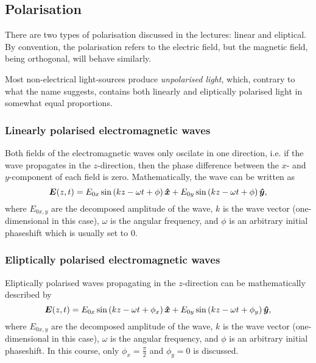     \subsection{Polarisation}
        There are two types of polarisation discussed in the lectures: linear and eliptical.
        By convention, the polarisation refers to the electric field, 
        but the magnetic field, being orthogonal, will behave similarly.
        
        Most non-electrical light-sources produce \textit{unpolarised light}, which, contrary to what the name suggests, 
        contains both linearly and eliptically polarised light in somewhat equal proportions. 

        \subsubsection{Linearly polarised electromagnetic waves}
            Both fields of the electromagnetic waves only oscilate in one direction,
            i.e. if the wave propagates in the $z$-direction, 
            then the phase difference between the $x$- and $y$-component of each field is zero.
            Mathematically, the wave can be written as
            \begin{equation}
                \E(z, t) = E_{0x}\sin\left(kz - \omega t + \phi\right)\hat{x} +
                E_{0y}\sin\left(kz - \omega t + \phi\right)\hat{y},
            \end{equation}
            where $E_{0x,y}$ are the decomposed amplitude of the wave, 
            $k$ is the wave vector (one-dimensional in this case), 
            $\omega$ is the angular frequency, 
            and $\phi$ is an arbitrary initial phaseshift which is usually set to 0.

        \subsubsection{Eliptically polarised electromagnetic waves}
            Eliptically polarised waves propagating in the $z$-direction can be mathematically described by
            \begin{equation}
                \E(z, t) = E_{0x}\sin\left(kz - \omega t + \phi_x \right)\hat{x} +
                E_{0y}\sin\left(kz - \omega t + \phi_y \right)\hat{y},
            \end{equation}
            where $E_{0x,y}$ are the decomposed amplitude of the wave, 
            $k$ is the wave vector (one-dimensional in this case), 
            $\omega$ is the angular frequency, 
            and $\phi$ is an arbitrary initial phaseshift. 
            In this course, only $\phi_x = \frac{\pi}{2}$ and $\phi_y = 0$ is discussed.
            
